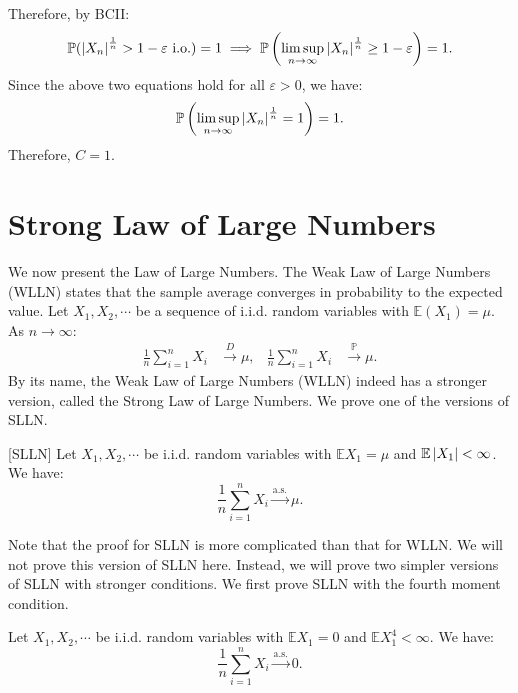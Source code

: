 \documentclass{huhtakm-template-book-v2}
\newcommand{\prob}{\mathbb{P}}
\newcommand{\expect}{\mathbb{E}}
\begin{document}
\begin{eg}
\begin{equation*}
        \end{equation*}
        Therefore, by BCII:
        \begin{equation*}
            \prob(\abs{X_{n}}^{\frac{1}{n}} > 1-\varepsilon\text{ i.o.}) = 1 \implies \prob\left(\limsup_{n \to \infty}\abs{X_{n}}^{\frac{1}{n}} \geq 1-\varepsilon\right) = 1.
        \end{equation*}
        Since the above two equations hold for all $\varepsilon > 0$, we have:
        \begin{equation*}
            \prob\left(\limsup_{n \to \infty}\abs{X_{n}}^{\frac{1}{n}} = 1\right) = 1.
        \end{equation*}
        Therefore, $C = 1$.
    \end{eg}
    \newpage

\section{Strong Law of Large Numbers}
    We now present the Law of Large Numbers. The Weak Law of Large Numbers (WLLN) states that the sample average converges in probability to the expected value. Let $X_{1},X_{2},\cdots$ be a sequence of i.i.d. random variables with $\expect(X_{1}) = \mu$.
    As $n \to \infty$:
    \begin{align*}
        \frac{1}{n}\sum_{i = 1}^{n}X_{i}& \xrightarrow{D} \mu, & \frac{1}{n}\sum_{i = 1}^{n}X_{i} &\xrightarrow{\prob} \mu.
    \end{align*}
    By its name, the Weak Law of Large Numbers (WLLN) indeed has a stronger version, called the Strong Law of Large Numbers. We prove one of the versions of SLLN.
    \begin{thm} [SLLN]
        Let $X_{1},X_{2},\cdots$ be i.i.d. random variables with $\expect{X_{1}} = \mu$ and $\expect\abs{X_{1}} < \infty$. We have:
        \begin{equation*}
            \frac{1}{n}\sum_{i = 1}^{n}X_{i} \xrightarrow{\text{a.s.}} \mu.
        \end{equation*}
    \end{thm}
    Note that the proof for SLLN is more complicated than that for WLLN. We will not prove this version of SLLN here. Instead, we will prove two simpler versions of SLLN with stronger conditions. We first prove SLLN with the fourth moment condition.
    \begin{thm}\named{SLLN with $\expect{X_{i}^{4}} < \infty$}
        Let $X_{1},X_{2},\cdots$ be i.i.d. random variables with $\expect{X_{1}} = 0$ and $\expect{X_{1}^{4}} < \infty$. We have:
        \begin{equation*}
            \frac{1}{n}\sum_{i = 1}^{n}X_{i} \xrightarrow{\text{a.s.}} 0.
        \end{equation*}
    \end{thm}
\end{document}
